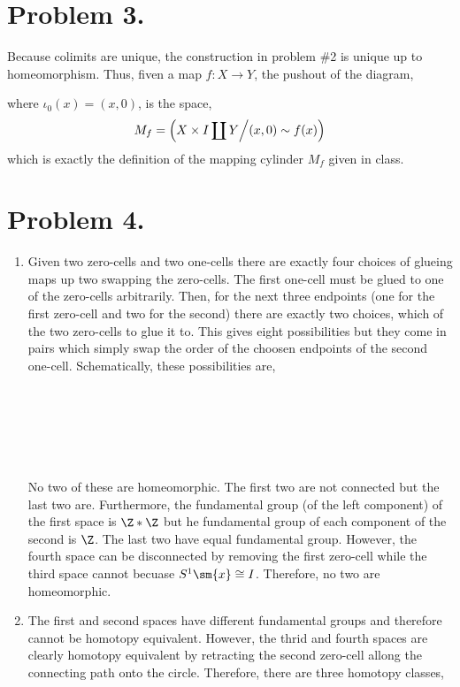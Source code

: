\documentclass[12pt]{extarticle}
\begin{document}
\section*{Problem 3.}
Because colimits are unique, the construction in problem \#2 is unique up to homeomorphism. Thus, fiven a map $f : X \to Y$, the pushout of the diagram,
\begin{center}
\end{center}
where $\iota_0(x) = (x, 0)$, is the space,
\[ M_f = \left(X \times I \coprod Y \middle/ (x, 0) \sim f(x) \right)  \]
which is exactly the definition of the mapping cylinder $M_f$ given in class. 

\section*{Problem 4.}
\begin{enumerate}
\item Given two zero-cells and two one-cells there are exactly four choices of glueing maps up two swapping the zero-cells. The first one-cell must be glued to one of the zero-cells arbitrarily. Then, for the next three endpoints (one for the first zero-cell and two for the second) there are exactly two choices, which of the two zero-cells to glue it to. This gives eight possibilities but they come in pairs which simply swap the order of the choosen endpoints of the second one-cell. Schematically, these possibilities are, 
\bigskip \\
\bigskip \\
\bigskip \\
\bigskip \\ 
\bigskip \\ 
\bigskip \\ 
\bigskip \\ 
No two of these are homeomorphic. The first two are not connected but the last two are. Furthermore, the fundamental group (of the left component) of the first space is $\Z * \Z$ but he fundamental group of each component of the second is $\Z$. The last two have equal fundamental group. However, the fourth space can be  disconnected by removing the first zero-cell while the third space cannot becuase $S^1 \sm \{x \} \cong I$. Therefore, no two are homeomorphic.

\item The first and second spaces have different fundamental groups and therefore cannot be homotopy equivalent. However, the thrid and fourth spaces are clearly homotopy equivalent by retracting the second zero-cell allong the connecting path onto the circle. Therefore, there are three homotopy classes,
\bigskip \\
\bigskip \\
\bigskip \\
\bigskip \\ 
\bigskip \\ 
\bigskip \\ 
\bigskip \\ 
\end{enumerate}
\end{document}
